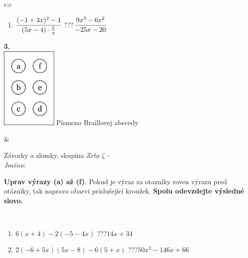 \documentclass[10pt]{report}
\begin{document}
\begin{tabular}{c:c}
\begin{minipage}[c][104.5mm][t]{0.5\linewidth}
\begin{center}
\begin{minipage}{0.79\linewidth}
\begin{center}
\begin{varwidth}{\linewidth}
\begin{enumerate}
\item $\cfrac{(-1+3x)^2-1}{(5x-4)\cdot\frac{5}{x}}$\quad \dotfill\; ???\;\dotfill \quad $\cfrac{9x^3-6x^2}{-25x-20}$
\end{enumerate}
\end{varwidth}
\end{center}
\end{minipage}
\begin{minipage}{0.20\linewidth}
\begin{center}
{\Huge\bfseries 3.} \\[2mm]
\includegraphics[height=40mm]{../images/braille.png}
{\small Písmeno Braillovej abecedy}
\end{center}
\end{minipage}
\end{center}
\end{minipage}
&
\begin{minipage}[c][104.5mm][t]{0.5\linewidth}
\begin{center}
\vspace{7mm}
{\huge Závorky a zlomky, skupina \textit{Zeta $\zeta$} -}\\[5mm]
\textit{Jméno:}\phantom{xxxxxxxxxxxxxxxxxxxxxxxxxxxxxxxxxxxxxxxxxxxxxxxxxxxxxxxxxxxxxxxxx}\\[5mm]
\begin{minipage}{0.95\linewidth}
\begin{center}
\textbf{Uprav výrazy (a) až (f)}. Pokud je výraz za otazníky roven výrazu pred otázniky, tak napravo obarvi príslušející kroužek. \textbf{Spolu odevzdejte výsledné slovo.}
\end{center}
\end{minipage}
\\[1mm]
\begin{minipage}{0.79\linewidth}
\begin{center}
\begin{varwidth}{\linewidth}
\begin{enumerate}
\normalsize
\item $6(x+4)-2(-5-4x)$\quad \dotfill\; ???\;\dotfill \quad $14x+34$
\item $2(-6+5x)(5x-8)-6(5+x)$\quad \dotfill\; ???\;\dotfill \quad $50x^2-146x+66$

\end{enumerate}
\end{varwidth}
\end{center}
\end{minipage}
\end{center}
\end{minipage}
\end{tabular}
\end{document}
